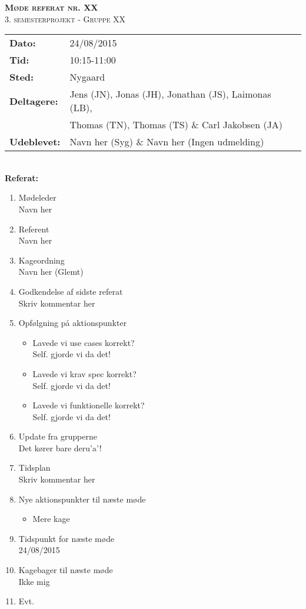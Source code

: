 
\newcommand{\HRule}{\rule{\linewidth}{0.1mm}}


	\begin{center}
		{\huge \bfseries \textsc{Møde referat nr. XX}}\\
		\textsc{\large 3. semesterprojekt - Gruppe XX}\\[0.3cm]
	\end{center}
	\begin{tabular}{ll}
	\large \textbf{Dato:} & 24/08/2015  \\ %
	\large \textbf{Tid:}  & 10:15-11:00 \\ %
	\large \textbf{Sted:} & Nygaard		\\ %
	\large \textbf{Deltagere:} & Jens (JN), Jonas (JH), Jonathan (JS), Laimonas (LB), \\
	\large \textbf & Thomas (TN),  Thomas (TS) \& Carl Jakobsen (JA)\\
	\large \textbf{Udeblevet:} & Navn her (Syg) \& Navn her (Ingen udmelding)	\\
	\end{tabular}\\
	\phantom{\,}\hspace{0.1em} \large \textbf{Referat:}
	\begin{enumerate}
		\itemsep 0.3em 
		\item Mødeleder\\
			Navn her
		\item Referent\\
			Navn her
		\item Kageordning\\
			Navn her (Glemt)
		\item Godkendelse af sidste referat\\
			Skriv kommentar her
		\item Opfølgning på aktionspunkter
		\begin{itemize}
			\itemsep 0.3em 
			\item Lavede vi use cases korrekt?\\
				Self. gjorde vi da det!
			\item Lavede vi krav spec korrekt?\\
				Self. gjorde vi da det!
			\item Lavede vi funktionelle korrekt?\\
				Self. gjorde vi da det!
		\end{itemize}
		\item Update fra grupperne\\
			Det kører bare deru'a'!
		\item Tidsplan\\
			Skriv kommentar her
		\item Nye aktionspunkter til næste møde
		\begin{itemize}
			\itemsep 0.3em 
			\item Mere kage
		\end{itemize}
		\item Tidspunkt for næste møde\\
			24/08/2015
		\item Kagebager til næste møde\\
			Ikke mig
		\item Evt.
	\end{enumerate}
